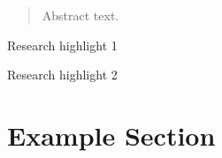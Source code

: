 \documentclass[preprint,12pt]{elsarticle}
\begin{document}
\begin{frontmatter}
\begin{abstract}
Abstract text.
\end{abstract}

\begin{graphicalabstract}
\end{graphicalabstract}

\begin{highlights}
\item Research highlight 1
\item Research highlight 2
\end{highlights}

\begin{keyword}



\end{keyword}

\end{frontmatter}



\section{Example Section}
\label{sec1}


\end{document}
